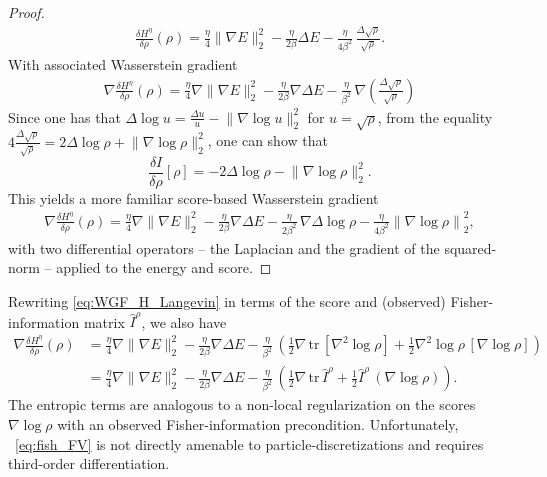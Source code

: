\documentclass[reqno,11pt,letterpaper]{amsart}
\theoremstyle{plain}
\theoremstyle{definition}
\theoremstyle{remark}
\newcommand{\tr}{\mathrm{tr}}
\begin{document}
\begin{proof}
\begin{align*}
    \frac{\delta  H^{\eta}}{\delta \rho}(\rho) = \frac{\eta}{4}\lVert \nabla E \rVert_{2}^{2} - \frac{\eta}{2 \beta} \Delta E - \frac{\eta}{4 \beta^{2}}\, \frac{\Delta \sqrt{ \rho}}{\sqrt{\rho}} .
\end{align*}
With associated Wasserstein gradient
\begin{align*}
    \nabla \frac{\delta  H^{\eta}}{\delta \rho}(\rho) = \frac{\eta}{4} \nabla \lVert \nabla E \rVert_{2}^{2} - \frac{\eta}{2 \beta} \nabla \Delta E - \frac{\eta}{ \beta^{2}}\, \nabla \left( \frac{\Delta \sqrt{ \rho}}{\sqrt{\rho}} \right)
\end{align*}
Since one has that $\Delta \log u = \frac{\Delta u}{u} - \lVert \nabla \log u \rVert_{2}^{2}$
for $u = \sqrt{\rho}$, from the equality $4\frac{\Delta \sqrt{ \rho}}{\sqrt{\rho}} = 2 \Delta \log \rho + \lVert \nabla \log\rho \rVert_{2}^{2}$, one can show that
\[
\frac{\delta I}{\delta \rho} [\rho] =- 2 \Delta \log \rho - \lVert \nabla \log \rho \rVert_{2}^{2}.
\]
This yields a more familiar score-based Wasserstein gradient
\begin{align*}
    \nabla \frac{\delta  H^{\eta}}{\delta \rho}(\rho) = \frac{\eta}{4} \nabla \lVert \nabla E \rVert_{2}^{2} - \frac{\eta}{2 \beta} \nabla \Delta E - \frac{\eta}{ 2\beta^{2}}\, \nabla  \Delta \log \rho - \frac{\eta}{4\beta^{2}} \left\lVert \nabla \log \rho \right\rVert_{2}^{2}, 
\end{align*}
with two differential operators -- the Laplacian and the gradient of the squared-norm -- applied to the energy and score.
\end{proof}

Rewriting \eqref{eq:WGF_H_Langevin} in terms of the score and (observed) Fisher-information matrix $\hat I^{\rho}$, we also have
\begin{align*}
 \nabla \frac{\delta  H^{\eta}}{\delta \rho}(\rho) &= \frac{\eta}{4} \nabla \lVert \nabla E \rVert_{2}^{2} - \frac{\eta}{2 \beta} \nabla \Delta E - \frac{\eta}{ \beta^{2}}\,  \left(  \frac{1}{2} \nabla\,\tr\, [\nabla^{2} \log \rho] + \frac{1}{2} \nabla^{2} \log \rho\, [\nabla \log \rho] \right) \\
 &=\frac{\eta}{4} \nabla \lVert \nabla E \rVert_{2}^{2} - \frac{\eta}{2 \beta} \nabla \Delta E - \frac{\eta}{ \beta^{2}}\,  \left(  \frac{1}{2} \nabla\,\tr\, \hat I^{\rho} + \frac{1}{2} \hat I^{\rho}\, (\nabla \log \rho) \right).
 \end{align*}
The entropic terms are analogous to a non-local regularization on the scores $\nabla \log \rho$ with an observed Fisher-information precondition. Unfortunately, ~\eqref{eq:fish_FV} is not directly amenable to particle-discretizations and requires third-order differentiation.
\end{document}
